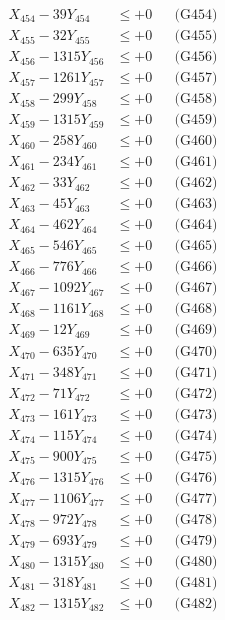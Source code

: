 \documentclass[a4paper,10pt]{article}
\begin{document}
{\begin{align}
X_{454} - 39Y_{454} &\leq +0 && \text{(G454)} \\
X_{455} - 32Y_{455} &\leq +0 && \text{(G455)} \\
X_{456} - 1315Y_{456} &\leq +0 && \text{(G456)} \\
X_{457} - 1261Y_{457} &\leq +0 && \text{(G457)} \\
X_{458} - 299Y_{458} &\leq +0 && \text{(G458)} \\
X_{459} - 1315Y_{459} &\leq +0 && \text{(G459)} \\
X_{460} - 258Y_{460} &\leq +0 && \text{(G460)} \\
\allowbreak
X_{461} - 234Y_{461} &\leq +0 && \text{(G461)} \\
X_{462} - 33Y_{462} &\leq +0 && \text{(G462)} \\
X_{463} - 45Y_{463} &\leq +0 && \text{(G463)} \\
X_{464} - 462Y_{464} &\leq +0 && \text{(G464)} \\
X_{465} - 546Y_{465} &\leq +0 && \text{(G465)} \\
X_{466} - 776Y_{466} &\leq +0 && \text{(G466)} \\
X_{467} - 1092Y_{467} &\leq +0 && \text{(G467)} \\
X_{468} - 1161Y_{468} &\leq +0 && \text{(G468)} \\
X_{469} - 12Y_{469} &\leq +0 && \text{(G469)} \\
X_{470} - 635Y_{470} &\leq +0 && \text{(G470)} \\
\allowbreak
X_{471} - 348Y_{471} &\leq +0 && \text{(G471)} \\
X_{472} - 71Y_{472} &\leq +0 && \text{(G472)} \\
X_{473} - 161Y_{473} &\leq +0 && \text{(G473)} \\
X_{474} - 115Y_{474} &\leq +0 && \text{(G474)} \\
X_{475} - 900Y_{475} &\leq +0 && \text{(G475)} \\
X_{476} - 1315Y_{476} &\leq +0 && \text{(G476)} \\
X_{477} - 1106Y_{477} &\leq +0 && \text{(G477)} \\
X_{478} - 972Y_{478} &\leq +0 && \text{(G478)} \\
X_{479} - 693Y_{479} &\leq +0 && \text{(G479)} \\
X_{480} - 1315Y_{480} &\leq +0 && \text{(G480)} \\
\allowbreak
X_{481} - 318Y_{481} &\leq +0 && \text{(G481)} \\
X_{482} - 1315Y_{482} &\leq +0 && \text{(G482)} \\

\end{align}}
\end{document}
